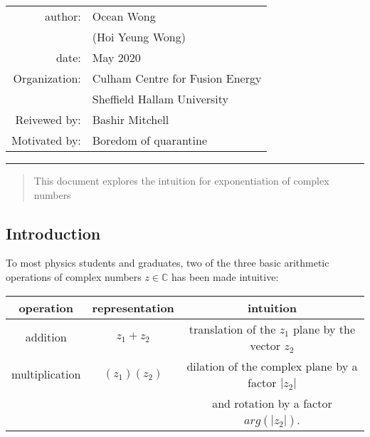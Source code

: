 \documentclass[a4paper, 12pt]{article}
\begin{document}
    
\begin{table}[!h]
\centering
\begin{tabular}{rl}
author:&Ocean Wong          \\
       &(Hoi Yeung Wong)    \\
date:  &May 2020       \\
Organization:&Culham Centre for Fusion Energy\\
            & Sheffield Hallam University\\
Reivewed by:&Bashir Mitchell\\
Motivated by:&Boredom of quarantine
\end{tabular}
\end{table}
\hrule
\begin{abstract}
This document explores the intuition for exponentiation of complex numbers
\end{abstract}
\begin{center}
\chapter{}
\end{center}
\section{Introduction}
To most physics students and graduates, two of the three basic arithmetic operations of complex numbers $z \in \mathbb{C}$ has been made intuitive:
\begin{longtable}{ccc}
\hline
operation& representation & intuition\\
\hline
addition & $z_1+z_2$ & translation of the $z_1$ plane by the vector $z_2$\\
multiplication & $(z_1)(z_2)$ & dilation of the complex plane by a factor $|z_2|$\\ && and rotation by a factor $arg(|z_2|)$. \\
\hline
\end{longtable}
\end{document}
